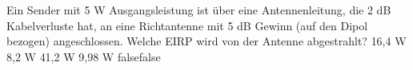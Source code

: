     {Ein Sender mit 5 W Ausgangsleistung ist über eine Antennenleitung, die 2 dB Kabelverluste hat, an eine Richtantenne mit 5 dB Gewinn (auf den Dipol bezogen) angeschlossen. Welche EIRP wird von der Antenne abgestrahlt?}
    {16,4 W}
    {8,2 W}
    {41,2 W}
    {9,98 W}
    {false}{false}